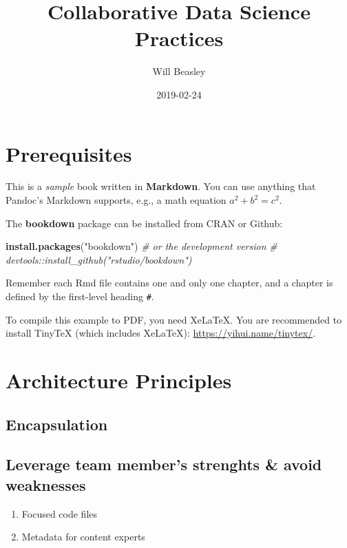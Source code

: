 \documentclass[]{book}
\title{Collaborative Data Science Practices}
\author{Will Beasley}
\date{2019-02-24}
\newenvironment{Shaded}{\begin{snugshade}}{\end{snugshade}}
\newcommand{\CommentTok}[1]{\textcolor[rgb]{0.56,0.35,0.01}{\textit{#1}}}
\newcommand{\KeywordTok}[1]{\textcolor[rgb]{0.13,0.29,0.53}{\textbf{#1}}}
\newcommand{\NormalTok}[1]{#1}
\newcommand{\StringTok}[1]{\textcolor[rgb]{0.31,0.60,0.02}{#1}}
\providecommand{\tightlist}{%
  \setlength{\itemsep}{0pt}\setlength{\parskip}{0pt}}
\begin{document}
\maketitle

{
\setcounter{tocdepth}{1}
\tableofcontents
}
\hypertarget{prerequisites}{%
\chapter{Prerequisites}\label{prerequisites}}

This is a \emph{sample} book written in \textbf{Markdown}. You can use anything that Pandoc's Markdown supports, e.g., a math equation \(a^2 + b^2 = c^2\).

The \textbf{bookdown} package can be installed from CRAN or Github:

\begin{Shaded}
\begin{Highlighting}[]
\KeywordTok{install.packages}\NormalTok{(}\StringTok{"bookdown"}\NormalTok{)}
\CommentTok{# or the development version}
\CommentTok{# devtools::install_github("rstudio/bookdown")}
\end{Highlighting}
\end{Shaded}

Remember each Rmd file contains one and only one chapter, and a chapter is defined by the first-level heading \texttt{\#}.

To compile this example to PDF, you need XeLaTeX. You are recommended to install TinyTeX (which includes XeLaTeX): \url{https://yihui.name/tinytex/}.

\hypertarget{architecture}{%
\chapter{Architecture Principles}\label{architecture}}

\hypertarget{encapsulation}{%
\section{Encapsulation}\label{encapsulation}}

\hypertarget{leverage-team-members-strenghts-avoid-weaknesses}{%
\section{Leverage team member's strenghts \& avoid weaknesses}\label{leverage-team-members-strenghts-avoid-weaknesses}}

\begin{enumerate}
\def\labelenumi{\arabic{enumi}.}
\tightlist
\item
  Focused code files
\item
  Metadata for content experts
\end{enumerate}
\end{document}
